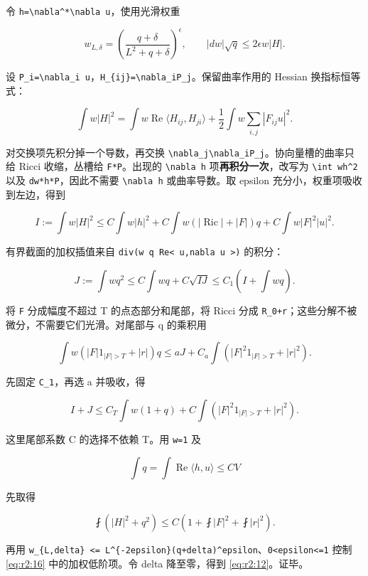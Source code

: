 \documentclass[UTF8,11pt,fontset=none]{ctexart}
\begin{document}
令 \texttt{h=\textbackslash{}nabla\^{}*\textbackslash{}nabla\ u}，使用光滑权重

\[
 w_{L,\delta}=\left(\frac{q+\delta}{L^2+q+\delta}\right)^\epsilon,
 \qquad |dw|\sqrt q\le2\epsilon w|H|.
\]

设 \texttt{P\_i=\textbackslash{}nabla\_i\ u}，\texttt{H\_\{ij\}=\textbackslash{}nabla\_iP\_j}。保留曲率作用的 Hessian 换指标恒等式：

\[
 \int w|H|^2=
 \int w\operatorname{Re}\langle H_{ij},H_{ji}\rangle
 +\frac12\int w\sum_{i,j}|F_{ij}u|^2.
 \tag{2.13}\label{eq:r2:13}
\]

对交换项先积分掉一个导数，再交换 \texttt{\textbackslash{}nabla\_j\textbackslash{}nabla\_iP\_j}。协向量槽的曲率只给 Ricci 收缩，丛槽给 \texttt{F*P}。出现的 \texttt{\textbackslash{}nabla\ h} 项\textbf{再积分一次}，改写为 \texttt{\textbackslash{}int\ w\textbar{}h\textbar{}\^{}2} 以及 \texttt{dw*h*P}，因此不需要 \texttt{\textbackslash{}nabla\ h} 或曲率导数。取 epsilon 充分小，权重项吸收到左边，得到

\[
 I:=\int w|H|^2
 \le C\int w|h|^2
 +C\int w(|\operatorname{Ric}|+|F|)q
 +C\int w|F|^2|u|^2.
 \tag{2.14}\label{eq:r2:14}
\]

有界截面的加权插值来自 \texttt{div(w\ q\ Re\textless{}\ u,nabla\ u\ \textgreater{})} 的积分：

\[
 J:=\int wq^2
 \le C\int wq+C\sqrt{IJ}
 \le C_1\left(I+\int wq\right).
 \tag{2.15}\label{eq:r2:15}
\]

将 \texttt{F} 分成幅度不超过 T 的点态部分和尾部，将 Ricci 分成 \texttt{R\_0+r}；这些分解不被微分，不需要它们光滑。对尾部与 q 的乘积用

\[
 \int w(|F|1_{|F|>T}+|r|)q
 \le aJ+C_a\int(|F|^2 1_{|F|>T}+|r|^2).
\]

先固定 \texttt{C\_1}，再选 a 并吸收，得

\[
 I+J\le C_T\int w(1+q)
 +C\int(|F|^2 1_{|F|>T}+|r|^2).
 \tag{2.16}\label{eq:r2:16}
\]

这里尾部系数 C 的选择不依赖 T。用 \texttt{w=1} 及

\[
 \int q=\int\operatorname{Re}\langle h,u\rangle\le C V
\]

先取得

\[
 \fint(|H|^2+q^2)\le C\left(1+\fint|F|^2+\fint|r|^2\right).
\]

再用 \texttt{w\_\{L,delta\}\ \textless{}=\ L\^{}\{-2epsilon\}(q+delta)\^{}epsilon}、\texttt{0\textless{}epsilon\textless{}=1} 控制 \eqref{eq:r2:16} 中的加权低阶项。令 delta 降至零，得到 \eqref{eq:r2:12}。证毕。
\end{document}
